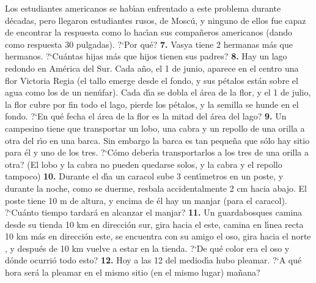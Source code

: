 \documentclass[12pt]{article}  %
\begin{document}
Los estudiantes americanos se hab\'{\i}an enfrentado a este problema durante d\'ecadas, pero llegaron estudiantes rusos,
 de Mosc\'u, y ninguno de ellos fue capaz de encontrar la respuesta como lo hac\'{\i}an sus compa\~neros americanos 
 (dando como respuesta 30 pulgadas). ?`Por qu\'e?
\newline\newline\quad
{\bf 7.} Vasya tiene 2 hermanas m\'as que hermanos. ?`Cu\'antas hijas m\'as que hijos tienen sus padres?
\newline\newline\quad
{\bf 8.} Hay un lago redondo en Am\'erica del Sur. Cada a\~no, el 1 de junio, aparece en el centro una flor Victoria Regia
 (el tallo emerge desde el fondo, y sus p\'etalos est\'an sobre el agua como los de un nen\'ufar). Cada d\'{\i}a se dobla
  el \'area de la flor, y el 1 de julio, la flor cubre por fin todo el lago, pierde los p\'etalos, y la semilla se hunde
   en el fondo. ?`En qu\'e fecha el \'area de la flor es la mitad del \'area del lago?    
\newline\newline\quad
{\bf 9.} Un campesino tiene que transportar un lobo, una cabra y un repollo de una orilla a otra del r\'{\i}o en una barca.
 Sin embargo la barca es tan peque\~na que s\'olo hay sitio para \'el y uno de los tres. ?`C\'omo deber\'{\i}a
  transportarlos a los tres de una orilla a otra? (El lobo y la cabra no pueden quedarse solos, y la cabra y el repollo
   tampoco)
\newline\newline\quad
{\bf 10.} Durante el d\'{\i}a un caracol sube 3 cent\'{\i}metros en un poste, y durante la noche, como se duerme, resbala
 accidentalmente 2 cm hacia abajo. El poste tiene 10 m de altura, y encima de \'el hay un manjar (para el caracol). 
  ?`Cu\'anto tiempo tardar\'a en alcanzar el manjar?
\newline\newline\quad
{\bf 11.} Un guardabosques camina desde su tienda 10 km en direcci\'on sur, gira hacia el este, camina en l\'{\i}nea recta
 10 km m\'as en direcci\'on este, se encuentra con su amigo el oso, gira hacia el norte , y despu\'es de 10 km vuelve a
  estar en la tienda. ?`De qu\'e color era el oso y d\'onde ocurri\'o todo esto?
\newline\newline\quad
{\bf 12.} Hoy a las 12 del mediod\'{\i}a hubo pleamar. ?`A qu\'e hora ser\'a la pleamar en el mismo sitio (en el mismo lugar)
 ma\~nana?
\newline\newline\quad
\end{document}
